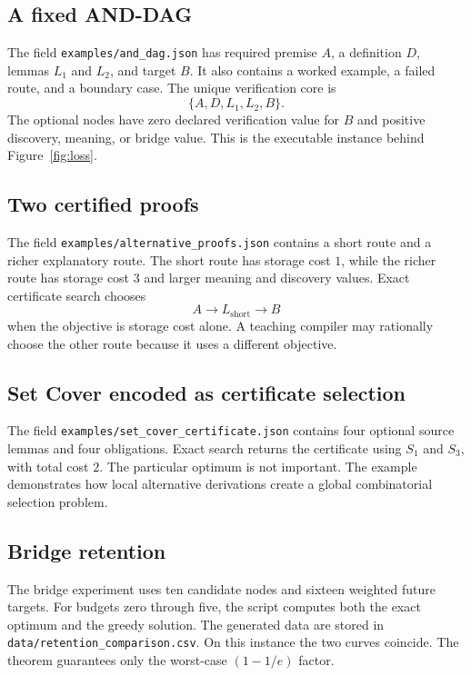 \documentclass[11pt,oneside]{article}
\theoremstyle{komorebiplain}
\theoremstyle{komorebidefinition}
\theoremstyle{komorebiremark}
\begin{document}
\subsection{A fixed AND-DAG}

The field \texttt{examples/and\_dag.json} has required premise $A$, a definition $D$, lemmas $L_1$ and $L_2$, and target $B$. It also contains a worked example, a failed route, and a boundary case. The unique verification core is
\[
\{A,D,L_1,L_2,B\}.
\]
The optional nodes have zero declared verification value for $B$ and positive discovery, meaning, or bridge value. This is the executable instance behind Figure~\ref{fig:loss}.

\subsection{Two certified proofs}

The field \texttt{examples/alternative\_proofs.json} contains a short route and a richer explanatory route. The short route has storage cost $1$, while the richer route has storage cost $3$ and larger meaning and discovery values. Exact certificate search chooses
\[
A\longrightarrow L_{\mathrm{short}}\longrightarrow B
\]
when the objective is storage cost alone. A teaching compiler may rationally choose the other route because it uses a different objective.

\subsection{Set Cover encoded as certificate selection}

The field \texttt{examples/set\_cover\_certificate.json} contains four optional source lemmas and four obligations. Exact search returns the certificate using $S_1$ and $S_3$, with total cost $2$. The particular optimum is not important. The example demonstrates how local alternative derivations create a global combinatorial selection problem.

\subsection{Bridge retention}

The bridge experiment uses ten candidate nodes and sixteen weighted future targets. For budgets zero through five, the script computes both the exact optimum and the greedy solution. The generated data are stored in \texttt{data/retention\_comparison.csv}. On this instance the two curves coincide. The theorem guarantees only the worst-case $(1-1/e)$ factor.
\end{document}
